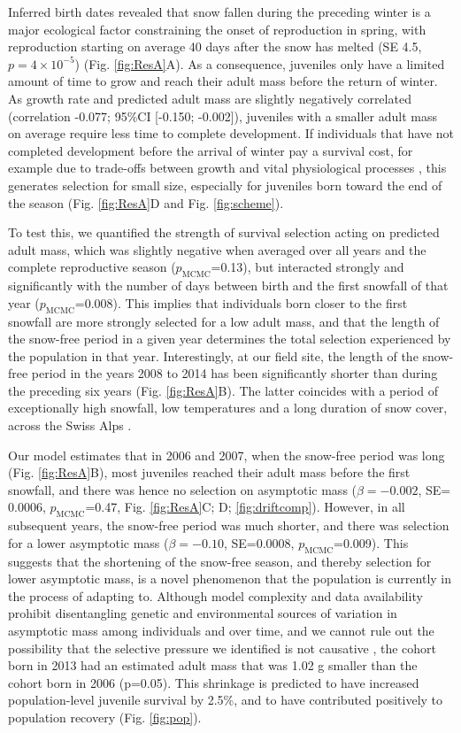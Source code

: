 Inferred birth dates revealed that snow fallen during the preceding winter is a major ecological factor constraining the onset of reproduction in spring, with reproduction starting on average 40 days after the snow has melted (SE 4.5, $p=4\times 10^{-5}$) (Fig. \ref{fig:ResA}A). As a consequence, juveniles only have a limited amount of time to grow and reach their adult mass before the return of winter. As growth rate and predicted adult mass are slightly negatively correlated (correlation -0.077; 95\%CI [-0.150; -0.002]), juveniles with a smaller adult mass on average require less time to complete development. If individuals that have not completed development before the arrival of winter pay a survival cost, for example due to trade-offs between growth and vital physiological processes \parencite{Stearns1986,Owens1999}, this generates selection for small size, especially for juveniles born toward the end of the season (Fig. \ref{fig:ResA}D and Fig. \ref{fig:scheme}). 

To test this, we quantified the strength of survival selection acting on predicted adult mass, which was slightly negative when averaged over all years and the complete reproductive season ($p_\mathrm{MCMC}$=0.13), but interacted strongly and significantly with the number of days between birth and the first snowfall of that year ($p_\mathrm{MCMC}$=0.008). This implies that individuals born closer to the first snowfall are more strongly selected for a low adult mass, and that the length of the snow-free period in a given year determines the total selection experienced by the population in that year. Interestingly, at our field site, the length of the snow-free period in the years 2008 to 2014 has been significantly shorter than during the preceding six years (Fig. \ref{fig:ResA}B). The latter coincides with a period of exceptionally high snowfall, low temperatures and a long duration of snow cover, across the Swiss Alps \parencite{Beniston2012}.

Our model estimates that in 2006 and 2007, when the snow-free period was long (Fig. \ref{fig:ResA}B), most juveniles reached their adult mass before the first snowfall, and there was hence no selection on asymptotic mass ($\beta=-0.002$, SE= 0.0006, $p_\mathrm{MCMC}$=0.47, Fig. \ref{fig:ResA}C; D; \ref{fig:driftcomp}). However, in all subsequent years, the snow-free period was much shorter, and there was selection for a lower asymptotic mass ($\beta=-0.10$, SE=0.0008, $p_\mathrm{MCMC}$=0.009). This suggests that the shortening of the snow-free season, and thereby selection for lower asymptotic mass, is a novel phenomenon that the population is currently in the process of adapting to. Although model complexity and data availability prohibit disentangling genetic and environmental sources of variation in asymptotic mass among individuals and over time, and we cannot rule out the possibility that the selective pressure we identified is not causative \parencite{Morrissey2014}, the cohort born in 2013 had an estimated adult mass that was 1.02 g smaller than the cohort born in 2006 (p=0.05). This shrinkage is predicted to have increased population-level juvenile survival by 2.5\%, and to have contributed positively to population recovery (Fig. \ref{fig:pop}). 

